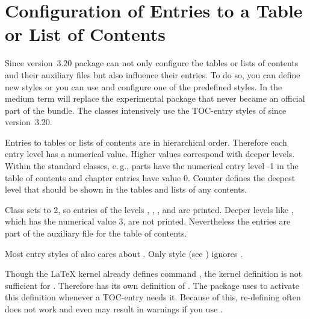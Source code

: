 \section{Configuration of Entries to a Table or List of Contents}
%
\BeginIndexGroup
{}%


Since version~3.20 package
 can not only configure the tables or lists of contents and
their auxiliary files but also influence their entries. To do so, you can
define new styles or you can use and configure one of the predefined
styles. In the medium term  will replace the experimental
package  that never became an official part of the
\KOMAScript{} bundle. The \KOMAScript{} classes intensively use the TOC-entry
styles of  since version~3.20.


\begin{Declaration}
\end{Declaration}
Entries to tables or lists of contents are in hierarchical order. Therefore
each entry level has a numerical value. Higher values correspond with deeper
levels. Within the standard classes, e.\,g., parts have the numerical entry
level -1 in the table of contents and chapter entries have value 0. Counter
 defines the deepest level that should be shown in the
tables and lists of any contents.

Class  sets  to 2, so entries of the levels
, , , and  are
printed. Deeper levels like , which has the numerical
value 3, are not printed. Nevertheless the entries are part of the auxiliary
file for the table of contents.

Most entry styles of  also cares about
. Only style  (see
) ignores .
%
\EndIndexGroup


\begin{Declaration}
\end{Declaration}
Though the \LaTeX{} kernel
already defines command , the kernel definition is not
sufficient for . Therefore  has its own
definition of . The package uses
 to activate this definition whenever a TOC-entry
needs it. Because of this, re-defining  often does not work
and even may result in warnings if you use .

